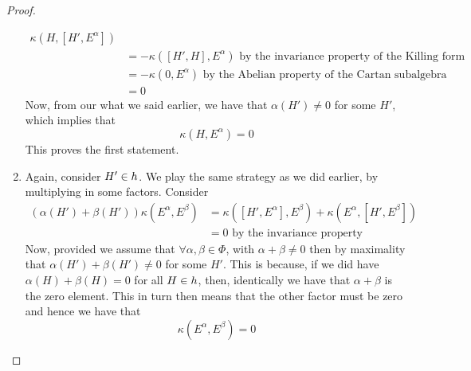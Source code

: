 \begin{thm}
\begin{proof}
\begin{enumerate}
\begin{align*}
			 \kappa ( H ,  [ H ', E ^ \alpha ] )  \\
								  &=  - \kappa ( [ H ' , H ] ,
								  E^ \alpha ) \text{ by the invariance 
								  property of the Killing form }\\
								  &=  - \kappa ( 0 , E ^ \alpha )  \text{ 
								  by the Abelian property of the 
							  Cartan subalgebra }\\
								  &=  0  
		\end{align*}
		Now, from our what we said earlier, we have that $ \alpha ( H ' ) \neq 0 $ for some  $ H ' $, which implies 
		that 
		 \[
			 \kappa ( H , E ^{ \alpha } ) = 0 
		 \] This proves the first statement. 
	\item Again, consider $ H ' \in h $. We play the same strategy as 
		we did earlier, by multiplying in some factors. Consider 
		\begin{align*}
			( \alpha ( H ') + \beta ( H ' ) ) \kappa ( E ^ \alpha , 
			E ^ \beta )  &=  \kappa ( [ H ' , E ^ \alpha ] , E ^ \beta )  
			+ \kappa ( E ^ \alpha , [ H ' , E ^ \beta ] ) \\
			 &=  0  \text{ by the invariance property} 
		\end{align*}
		Now, provided we assume that $ \forall \alpha, \beta \in \Phi$, 
		with $ \alpha + \beta \neq 0 $ then by maximality that 
		$ \alpha ( H ' ) + \beta ( H ' ) \neq 0 $ for some $ H ' $. 
		This is because, if we did have $ \alpha ( H ) + \beta ( H )  =0 $
		for all $ H \in h $, then, identically 
		we have that $ \alpha + \beta $ is the zero element. 
		This in turn then means that the other 
		factor must be zero and hence we have that 
		\[
		 \kappa ( E ^ \alpha , E ^ \beta ) = 0 
		\] 
	
\end{enumerate}
\end{proof}
\end{thm}

